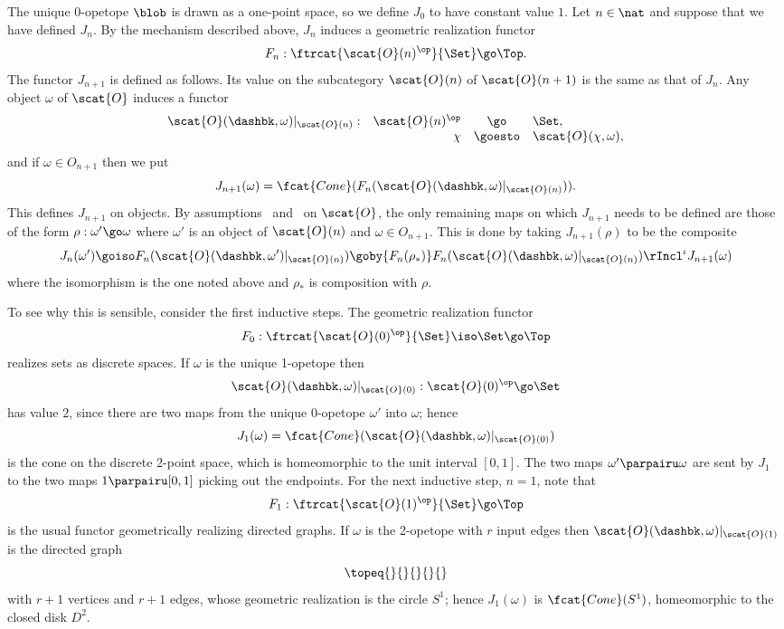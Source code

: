 The unique 0-opetope $\blob$ is drawn as a one-point space, so we define
$J_0$ to have constant value $1$.  Let $n\in\nat$ and suppose that we have
defined $J_n$.  By the mechanism described above, $J_n$ induces a geometric
realization functor
\[
F_n: \ftrcat{\scat{O}(n)^\op}{\Set} \go \Top.
\]
The functor $J_{n+1}$ is defined as follows.  Its value on the subcategory
$\scat{O}(n)$ of $\scat{O}(n+1)$ is the same as that of $J_n$.  Any object
$\omega$ of $\scat{O}$ induces a functor
\[
\begin{array}{rrcl}
\scat{O}(\dashbk, \omega)|_{\scat{O}(n)}:&
\scat{O}(n)^\op				&
\go					&
\Set,					\\
					&
\chi					&
\goesto					&
\scat{O}(\chi,\omega),			\\
\end{array}
\]
and if $\omega\in O_{n+1}$ then we put
\[
J_{n+1}(\omega) 
= 
\fcat{Cone}(F_n(\scat{O}(\dashbk, \omega)|_{\scat{O}(n)})).
\]
This defines $J_{n+1}$ on objects.  By assumptions~
and~ on $\scat{O}$, the only remaining maps on which
$J_{n+1}$ needs to be defined are those of the form $\rho: \omega' \go
\omega$ where $\omega'$ is an object of $\scat{O}(n)$ and $\omega\in
O_{n+1}$.  This is done by taking $J_{n+1}(\rho)$ to be the composite
\[
J_n(\omega') \goiso F_n(\scat{O}(\dashbk, \omega')|_{\scat{O}(n)})
\goby{F_n(\rho_*)} F_n(\scat{O}(\dashbk, \omega)|_{\scat{O}(n)})
\rIncl^{\iota} J_{n+1}(\omega)
\]
where the isomorphism is the one noted above and $\rho_*$ is composition
with $\rho$. 

To see why this is sensible, consider the first inductive steps.  The
geometric realization functor
\[
F_0: \ftrcat{\scat{O}(0)^\op}{\Set} \iso \Set \go \Top
\]
realizes sets as discrete spaces.  If $\omega$ is the unique 1-opetope then
\[
\scat{O}(\dashbk,\omega)|_{\scat{O}(0)}:
\scat{O}(0)^\op
\go
\Set
\]
has value $2$, since there are two maps from the unique 0-opetope $\omega'$
into $\omega$; hence
\[
J_1(\omega) = \fcat{Cone}(\scat{O}(\dashbk,\omega)|_{\scat{O}(0)})
\]
is the cone on the discrete 2-point space, which is homeomorphic to the
unit interval $[0,1]$.  The two maps $\omega' \parpairu \omega$ are sent by
$J_1$ to the two maps $1 \parpairu [0,1]$ picking out the endpoints.  For
the next inductive step, $n=1$, note that 
\[
F_1: \ftrcat{\scat{O}(1)^\op}{\Set} \go \Top
\]
is the usual functor geometrically%
%
%
realizing directed graphs.  If $\omega$
is the 2-opetope with $r$ input edges then
$\scat{O}(\dashbk,\omega)|_{\scat{O}(1)}$ is the directed graph
\[
\topeq{}{}{}{}{}
\]
with $r+1$ vertices and $r+1$ edges, whose geometric realization is the
circle $S^1$; hence $J_1(\omega)$ is $\fcat{Cone}(S^1)$, homeomorphic to
the closed disk $D^2$.%
%
%
%
%
%
%
%
%
%


